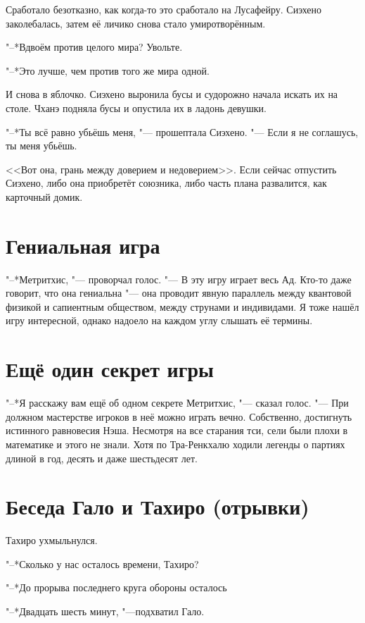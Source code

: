 Сработало безотказно, как когда-то это сработало на Лусафейру.
Сиэхено заколебалась, затем её личико снова стало умиротворённым.

"--*Вдвоём против целого мира?
Увольте.

"--*Это лучше, чем против того же мира одной.

И снова в яблочко.
Сиэхено выронила бусы и судорожно начала искать их на столе.
Чханэ подняла бусы и опустила их в ладонь девушки.

"--*Ты всё равно убьёшь меня, "--- прошептала Сиэхено.
"--- Если я не соглашусь, ты меня убьёшь.

<<Вот она, грань между доверием и недоверием>>.
Если сейчас отпустить Сиэхено, либо она приобретёт союзника, либо часть плана развалится, как карточный домик.

\section{Гениальная игра}

"--*Метритхис, "--- проворчал голос.
"--- В эту игру играет весь Ад.
Кто-то даже говорит, что она гениальна "--- она проводит явную параллель между квантовой физикой и сапиентным обществом, между струнами и индивидами.
Я тоже нашёл игру интересной, однако надоело на каждом углу слышать её термины.

\section{Ещё один секрет игры}

"--*Я расскажу вам ещё об одном секрете Метритхис, "--- сказал голос.
"--- При должном мастерстве игроков в неё можно играть вечно.
Собственно, достигнуть истинного равновесия Нэша.
Несмотря на все старания тси, сели были плохи в математике и этого не знали.
Хотя по Тра-Ренкхалю ходили легенды о партиях длиной в год, десять и даже шестьдесят лет.

\section{Беседа Гало и Тахиро (отрывки)}

Тахиро ухмыльнулся.

"--*Сколько у нас осталось времени, Тахиро?

"--*До прорыва последнего круга обороны осталось\ldotst

"--*Двадцать шесть минут, "---подхватил Гало.

